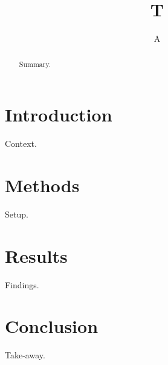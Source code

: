 \documentclass{article}
\begin{document}
\title{T}\author{A}
\begin{abstract}Summary.\end{abstract}
\maketitle
\section{Introduction}Context.
\section{Methods}Setup.
\section{Results}Findings.
\section{Conclusion}Take-away.

\end{document}
